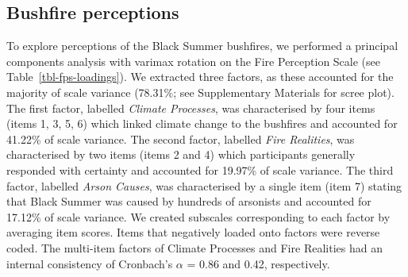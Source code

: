 \documentclass[
  letterpaper,
  DIV=11,
  numbers=noendperiod]{scrartcl}
\begin{document}
\hypertarget{bushfire-perceptions}{%
\subsection{Bushfire perceptions}\label{bushfire-perceptions}}

To explore perceptions of the Black Summer bushfires, we performed a
principal components analysis with varimax rotation on the Fire
Perception Scale (see Table~\ref{tbl-fps-loadings}). We extracted three
factors, as these accounted for the majority of scale variance (78.31\%;
see Supplementary Materials for scree plot). The first factor, labelled
\emph{Climate Processes}, was characterised by four items (items 1, 3,
5, 6) which linked climate change to the bushfires and accounted for
41.22\% of scale variance. The second factor, labelled \emph{Fire
Realities}, was characterised by two items (items 2 and 4) which
participants generally responded with certainty and accounted for
19.97\% of scale variance. The third factor, labelled \emph{Arson
Causes}, was characterised by a single item (item 7) stating that Black
Summer was caused by hundreds of arsonists and accounted for 17.12\% of
scale variance. We created subscales corresponding to each factor by
averaging item scores. Items that negatively loaded onto factors were
reverse coded. The multi-item factors of Climate Processes and Fire
Realities had an internal consistency of Cronbach's \(\alpha\) = 0.86
and 0.42, respectively.
\end{document}
